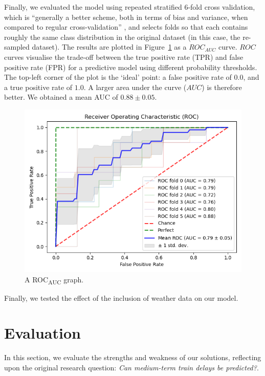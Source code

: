 \documentclass[12pt,a4paper]{article}
\begin{document}
Finally, we evaluated the model using repeated stratified $6$-fold cross validation, which is “generally a better scheme, both in terms of bias and variance, when compared to regular cross-validation” \cite{kohavi_1995}, and selects folds so that each contains roughly the same class distribution in the original dataset (in this case, the re-sampled dataset). The results are plotted in Figure~\ref{fig:roc} as a $ROC_{AUC}$ curve. $ROC$ curves visualise the trade-off between the true positive rate (TPR) and false positive rate (FPR) for a predictive model using different probability thresholds. The top-left corner of the plot is the ‘ideal’ point: a false positive rate of $0.0$, and a true positive rate of $1.0$. A larger area under the curve ($AUC$) is therefore better. We obtained a mean AUC of $0.88 \pm 0.05$. 

\begin{figure}[h!]
  \includegraphics[width=\linewidth]{images/roc_auc.png}
  \caption{A ROC\textsubscript{AUC} graph.}
  \label{fig:roc}
\end{figure}

Finally, we tested the effect of the inclusion of weather data on our model. 

\section{Evaluation}

In this section, we evaluate the strengths and weakness of our solutions, reflecting upon the original research question: \textit{Can medium-term train delays be predicted?}.
\end{document}
